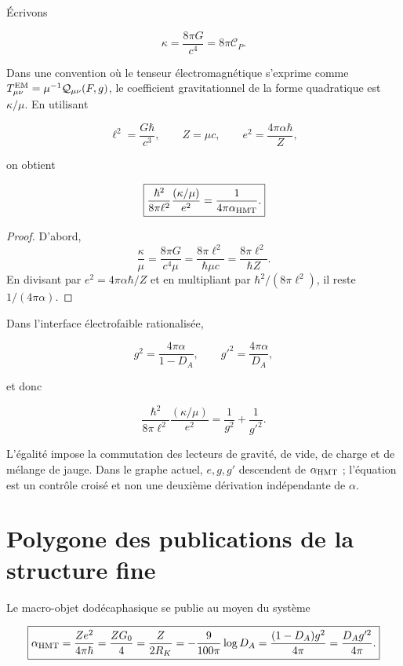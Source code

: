 Écrivons

\[
\kappa=\frac{8\pi G}{c^4}=8\pi\mathscr C_P.
\]

Dans une convention où le tenseur électromagnétique s'exprime comme
\(T_{\mu\nu}^{\rm EM}=\mu^{-1}\mathcal Q_{\mu\nu}(F,g)\), le coefficient
gravitationnel de la forme quadratique est \(\kappa/\mu\). En utilisant

\[
\ell^2=\frac{G\hbar}{c^3},
\qquad
Z=\mu c,
\qquad
e^2=\frac{4\pi\alpha\hbar}{Z},
\]

on obtient

\begin{equation}
\boxed{
\frac{\hbar^2}{8\pi\ell^2}
\frac{(\kappa/\mu)}{e^2}
=\frac{1}{4\pi\alpha_{\rm HMT}}.}
\label{eq:rm-einstein-maxwell-alpha}
\end{equation}

\begin{proof}
D'abord,
\[
\frac{\kappa}{\mu}
=\frac{8\pi G}{c^4\mu}
=\frac{8\pi\ell^2}{\hbar\mu c}
=\frac{8\pi\ell^2}{\hbar Z}.
\]
En divisant par \(e^2=4\pi\alpha\hbar/Z\) et en multipliant par
\(\hbar^2/(8\pi\ell^2)\), il reste \(1/(4\pi\alpha)\).
\end{proof}

Dans l'interface électrofaible rationalisée,

\[
g^2=\frac{4\pi\alpha}{1-D_A},
\qquad
g'^2=\frac{4\pi\alpha}{D_A},
\]

et donc

\begin{equation}
\boxed{
\frac{\hbar^2}{8\pi\ell^2}
\frac{(\kappa/\mu)}{e^2}
=\frac1{g^2}+\frac1{g'^2}.}
\label{eq:rm-cross-einstein-ew}
\end{equation}

L'égalité impose la commutation des lecteurs de gravité, de vide, de charge et de
mélange de jauge. Dans le graphe actuel, \(e,g,g'\) descendent de
\(\alpha_{\rm HMT}\) ; l'équation est un contrôle croisé et non une deuxième
dérivation indépendante de \(\alpha\).

\section{Polygone des publications de la structure fine}

Le macro-objet dodécaphasique se publie au moyen du système

\begin{equation}
\boxed{
\alpha_{\rm HMT}
=\frac{Ze^2}{4\pi\hbar}
=\frac{ZG_0}{4}
=\frac{Z}{2R_K}
=-\frac{9}{100\pi}\log D_A
=\frac{(1-D_A)g^2}{4\pi}
=\frac{D_Ag'^2}{4\pi}.}
\label{eq:rm-alpha-polygon}
\end{equation}

